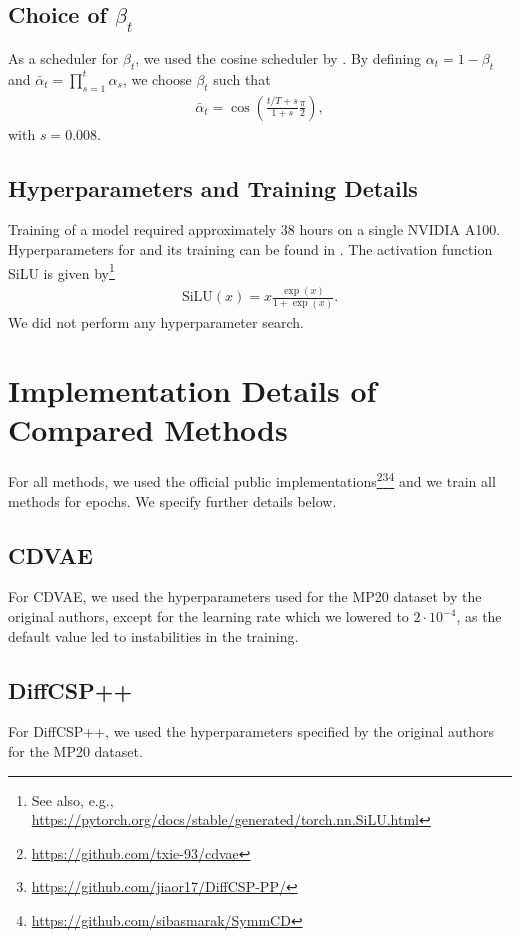 \subsection{Choice of $\beta_t$}
As a scheduler for $\beta_t$, we used the cosine scheduler by \citet{hoogeboom_argmax_2021-1}. By defining $\alpha_t = 1 - \beta_t$ and $\bar \alpha_t = \prod_{s=1}^t \alpha_s$, we choose $\beta_t$ such that
\begin{align}
    \bar \alpha_t = \cos\left(\frac{t/T + s}{1 + s}\frac{\pi}{2}\right),
\end{align}
with $s=0.008$.

\subsection{Hyperparameters and Training Details}
Training of a model required approximately 38 hours on a single NVIDIA A100. Hyperparameters for \ourmodel and its training can be found in . The activation function SiLU \cite{ramachandran_searching_2017} is given by\footnote{See also, e.g., \url{https://pytorch.org/docs/stable/generated/torch.nn.SiLU.html}}
\begin{align}
    \text{SiLU}(x) = x \frac{\exp(x)}{1 + \exp(x)} \label{eq:silu}.
\end{align}
We did not perform any hyperparameter search. 


\section{Implementation Details of Compared Methods}
\label{app:compared_methods}
For all methods, we used the official public implementations\footnote{\url{https://github.com/txie-93/cdvae}}\footnote{\url{https://github.com/jiaor17/DiffCSP-PP/}}\footnote{\url{https://github.com/sibasmarak/SymmCD}} and we train all methods for  epochs. We specify further details below.

\subsection{CDVAE}
For CDVAE, we used the hyperparameters used for the MP20 dataset by the original authors, except for the learning rate which we lowered to $2\cdot10^{-4}$, as the default value led to instabilities in the training.


\subsection{DiffCSP++}
For DiffCSP++, we used the hyperparameters specified by the original authors for the MP20 dataset.


